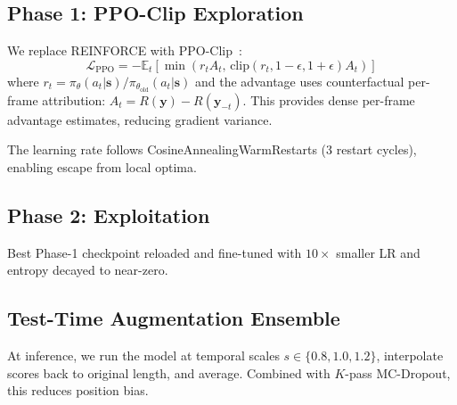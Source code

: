 \documentclass[letterpaper]{article}
\begin{document}
\subsection{Phase 1: PPO-Clip Exploration}

We replace REINFORCE with PPO-Clip~\cite{schulman2017proximal}:
\begin{equation}
\mathcal{L}_{\text{PPO}} = -\mathbb{E}_t\left[\min\!\left(r_t A_t,\, \text{clip}(r_t, 1{-}\epsilon, 1{+}\epsilon) A_t\right)\right]
\end{equation}
where $r_t = \pi_\theta(a_t|\mathbf{s})/\pi_{\theta_{\text{old}}}(a_t|\mathbf{s})$
and the advantage uses counterfactual per-frame attribution:
$A_t = R(\mathbf{y}) - R(\mathbf{y}_{-t})$.
This provides dense per-frame advantage estimates, reducing gradient variance.

The learning rate follows CosineAnnealingWarmRestarts (3 restart cycles),
enabling escape from local optima.

\subsection{Phase 2: Exploitation}

Best Phase-1 checkpoint reloaded and fine-tuned with $10\times$ smaller LR
and entropy decayed to near-zero.

\subsection{Test-Time Augmentation Ensemble}

At inference, we run the model at temporal scales $s \in \{0.8, 1.0, 1.2\}$,
interpolate scores back to original length, and average. Combined with
$K$-pass MC-Dropout, this reduces position bias.
\end{document}
